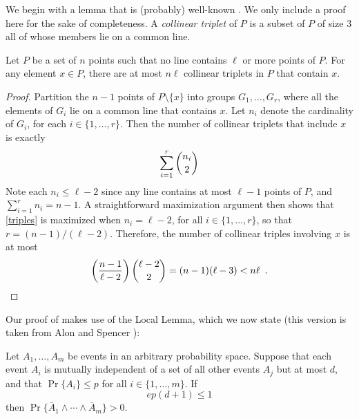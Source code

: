 \documentclass{patmorin}
\begin{document}
We begin with a lemma that is (probably) well-known \cite{?}. We only
include a proof here for the sake of completeness.  A \emph{collinear
triplet} of $P$ is a subset of $P$ of size 3 all of whose members lie
on a common line.

\begin{lem}
Let $P$ be a set of $n$ points such that no line contains $\ell$ or
more points of $P$.  For any element $x\in P$, there are at most $n\ell$
collinear triplets in $P$ that contain $x$.
\end{lem}

\begin{proof}
Partition the $n-1$ points of $P\setminus\{x\}$ into groups
$G_1,\ldots,G_r$, where all the elements of $G_i$ lie on a common line
that contains $x$.  Let $n_i$ denote the cardinality of $G_i$,
for each $i\in\{1,\ldots,r\}$.  Then the number of collinear triplets
that include $x$ is exactly
\begin{equation}
   \sum_{i=1}^r \binom{n_i}{2} \eqlabel{triples}
\end{equation}
Note each $n_i \le \ell-2$ since any line contains at most $\ell-1$
points of $P$, and $\sum_{i=1}^r n_i=n-1$.  A straightforward maximization
argument then shows that \eqref{triples} is maximized when $n_i=\ell-2$,
for all $i\in\{1,\ldots,r\}$, so that $r=(n-1)/(\ell-2)$.  Therefore,
the number of collinear triples involving $x$ is at most
\[
    \left(\frac{n-1}{\ell-2}\right)\binom{\ell-2}{2} = (n-1)(\ell-3) < n\ell \enspace . 
    \qedhere
\]
\end{proof}


Our proof of  makes use of the Local Lemma, which
we now state (this version is taken from Alon and Spencer
\cite[Corollary~5.1.2]{as97}):

\begin{lem}
  Let $A_1,\ldots,A_m$ be events in an arbitrary probability space.
  Suppose that each event $A_i$ is mutually independent of a set of
  all other events $A_j$ but at most $d$, and that $\Pr\{A_i\} \le p$
  for all $i\in\{1,\ldots,m\}$.  If
  \[
       ep(d+1)\le 1
  \]
  then $\Pr\{\bar{A}_1\wedge\cdots\wedge \bar{A}_m\} > 0$.
\end{lem}
\end{document}
